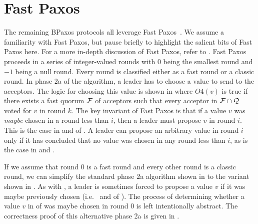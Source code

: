 \section{Fast Paxos}
{}
{}

{}

The remaining BPaxos protocols all leverage Fast Paxos~\cite{lamport2006fast}.
We assume a familiarity with Fast Paxos, but pause briefly to highlight the
salient bits of Fast Paxos here. For a more in-depth discussion of Fast Paxos,
refer to .
%
Fast Paxos proceeds in a series of integer-valued rounds with $0$ being the
smallest round and $-1$ being a null round. Every round is classified either as
a fast round or a classic round. In phase 2a of the algorithm, a leader has to
choose a value to send to the acceptors. The logic for choosing this value is
shown in  where $O4(v)$ is true if there exists a fast
quorum $\mathcal{F}$ of acceptors such that every acceptor in $\mathcal{F} \cap
\mathcal{Q}$ voted for $v$ in round $k$.
%
The key invariant of Fast Paxos is that if a value $v$ was \emph{maybe} chosen
in a round less than $i$, then a leader must propose $v$ in round $i$. This is
the case in  and  of
. A leader can propose an arbitrary value in round $i$ only
if it has concluded that no value was chosen in any round less than $i$, as is
the case in  and .

If we assume that round $0$ is a fast round and every other round is a classic
round, we can simplify the standard phase 2a algorithm shown in
 to the variant shown in . As with
, a leader is sometimes forced to propose a value $v$ if it
was maybe previously chosen (i.e.\  and
 of ). The process of
determining whether a value $v$ in  of
 was maybe chosen in round $0$ is left
intentionally abstract. The correctness proof of this alternative phase 2a is
given in .
